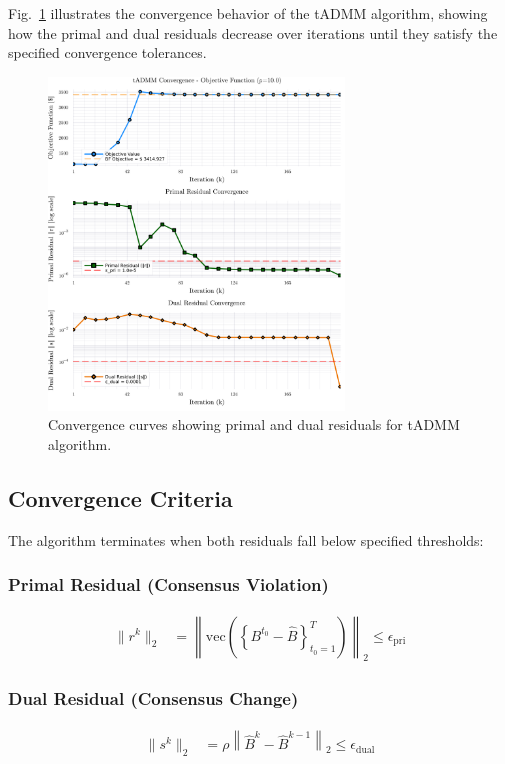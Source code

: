 Fig.~\ref{fig:convergence_curves} illustrates the convergence behavior of the tADMM algorithm, showing how the primal and dual residuals decrease over iterations until they satisfy the specified convergence tolerances.

\begin{figure}[h]
    \centering
    \includegraphics[width=0.7\textwidth]{figures/convergence-curves-copper-plate-T24-tadmm.png}
    \caption{Convergence curves showing primal and dual residuals for tADMM algorithm.}
    \label{fig:convergence_curves}
\end{figure}

\subsection{Convergence Criteria}

The algorithm terminates when both residuals fall below specified thresholds:

\subsubsection{Primal Residual (Consensus Violation)}
\begin{align}
\|r^k\|_2 &= \left\| \text{vec}\left( \left\{ B^{t_0} - \hat{B} \right\}_{t_0=1}^T \right) \right\|_2 \leq \epsilon_{\text{pri}}
\end{align}

\subsubsection{Dual Residual (Consensus Change)}
\begin{align}
\|s^k\|_2 &= \rho \left\| \hat{B}^k - \hat{B}^{k-1} \right\|_2 \leq \epsilon_{\text{dual}}
\end{align}

